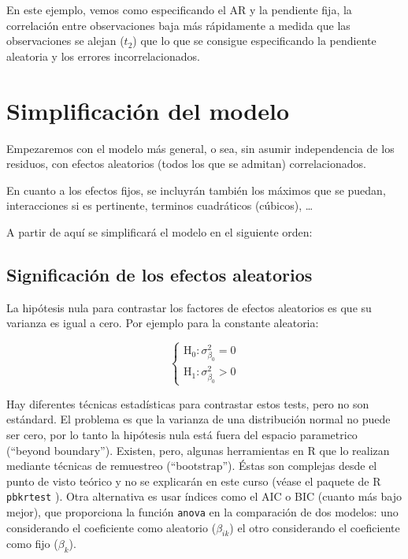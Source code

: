 \documentclass[
]{book}
\begin{document}
En este ejemplo, vemos como especificando el AR y la pendiente fija, la correlación entre observaciones baja más rápidamente a medida que las observaciones se alejan (\(t_2\)) que lo que se consigue especificando la pendiente aleatoria y los errores incorrelacionados.

\hypertarget{simplificaciuxf3n-del-modelo}{%
\section{Simplificación del modelo}\label{simplificaciuxf3n-del-modelo}}

Empezaremos con el modelo más general, o sea, sin asumir independencia de los residuos, con efectos aleatorios (todos los que se admitan) correlacionados.

En cuanto a los efectos fijos, se incluyrán también los máximos que se puedan, interacciones si es pertinente, terminos cuadráticos (cúbicos), \ldots{}

A partir de aquí se simplificará el modelo en el siguiente orden:

\hypertarget{significaciuxf3n-de-los-efectos-aleatorios}{%
\subsection{Significación de los efectos aleatorios}\label{significaciuxf3n-de-los-efectos-aleatorios}}

La hipótesis nula para contrastar los factores de efectos aleatorios es que su varianza es igual a cero. Por ejemplo para la constante aleatoria:

\[\left\{\begin{array}{l}
\text{H}_0: \sigma_{\beta_0}^2 = 0 \\
\text{H}_1: \sigma_{\beta_0}^2 > 0
\end{array}\right.
\]

Hay diferentes técnicas estadísticas para contrastar estos tests, pero no son estándard. El problema es que la varianza de una distribución normal no puede ser cero, por lo tanto la hipótesis nula está fuera del espacio parametrico (``beyond boundary''). Existen, pero, algunas herramientas en R que lo realizan mediante técnicas de remuestreo (``bootstrap''). Éstas son complejas desde el punto de visto teórico y no se explicarán en este curso (véase el paquete de R \texttt{pbkrtest} \citet{pbkrtest2014}).
Otra alternativa es usar índices como el AIC o BIC (cuanto más bajo mejor), que proporciona la función \texttt{anova} en la comparación de dos modelos: uno considerando el coeficiente como aleatorio (\(\beta_{ik}\)) el otro considerando el coeficiente como fijo (\(\beta_{k}\)).
\end{document}
